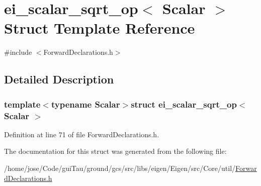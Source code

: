 \hypertarget{structei__scalar__sqrt__op}{\section{ei\-\_\-scalar\-\_\-sqrt\-\_\-op$<$ Scalar $>$ Struct Template Reference}
\label{structei__scalar__sqrt__op}
}


{\ttfamily \#include $<$Forward\-Declarations.\-h$>$}



\subsection{Detailed Description}
\subsubsection*{template$<$typename Scalar$>$struct ei\-\_\-scalar\-\_\-sqrt\-\_\-op$<$ Scalar $>$}



Definition at line 71 of file Forward\-Declarations.\-h.



The documentation for this struct was generated from the following file\-:\begin{DoxyCompactItemize}
\item 
/home/jose/\-Code/gui\-Tau/ground/gcs/src/libs/eigen/\-Eigen/src/\-Core/util/\hyperlink{_forward_declarations_8h}{Forward\-Declarations.\-h}\end{DoxyCompactItemize}
